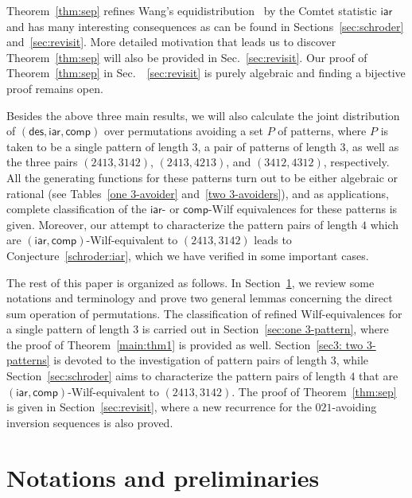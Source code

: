 \documentclass[12pt]{amsart}
\numberwithin{equation}{section}
\theoremstyle{plain}
\theoremstyle{definition}
\def\des{\mathsf{des}}
\def\iar{\mathsf{iar}}
\def\comp{\mathsf{comp}}
\begin{document}
Theorem~\ref{thm:sep} refines Wang's equidistribution~\cite[Thm.~1.5]{wan} by the Comtet statistic $\iar$ and has many interesting consequences as can be found in Sections~\ref{sec:schroder} and~\ref{sec:revisit}. More detailed motivation that leads us to discover Theorem~\ref{thm:sep} will also be provided  in Sec.~\ref{sec:revisit}. 
Our proof of Theorem~\ref{thm:sep} in Sec.~~\ref{sec:revisit} is purely algebraic and finding a bijective proof remains open. 

Besides the above three main results, we will also calculate the joint distribution of $(\des,\iar,\comp)$ over permutations avoiding a set $P$ of patterns, where $P$ is taken to be a single pattern of length $3$, a pair of patterns of length $3$, as well as the three pairs $(2413,3142)$, $(2413,4213)$, and $(3412,4312)$, respectively. All the generating functions for these patterns turn out to be either algebraic or rational (see Tables~\ref{one 3-avoider} and~\ref{two 3-avoiders}), and as applications, complete classification of the $\iar$- or $\comp$-Wilf equivalences for these patterns is given. Moreover, our attempt to characterize the pattern pairs of length $4$ which are $(\iar,\comp)$-Wilf-equivalent to $(2413,3142)$ leads to Conjecture~\ref{schroder:iar}, which we have verified in some important cases. 

The rest of this paper is organized as follows. In Section~\ref{sec:notation}, we review some notations and  terminology and prove two general lemmas concerning the direct sum operation of permutations. The classification of refined Wilf-equivalences for a single pattern of length $3$ is carried out in Section~\ref{sec:one 3-pattern}, where the proof of Theorem~\ref{main:thm1} is provided as well. Section~\ref{sec3: two 3-patterns} is devoted to the investigation of pattern pairs of length $3$, while Section~\ref{sec:schroder} aims to characterize the pattern pairs of length $4$ that are $(\iar,\comp)$-Wilf-equivalent to $(2413,3142)$. The proof of Theorem~\ref{thm:sep} is given in Section~\ref{sec:revisit}, where a new recurrence for the $021$-avoiding inversion sequences is also proved. 



\section{Notations and preliminaries}\label{sec:notation}
\end{document}
